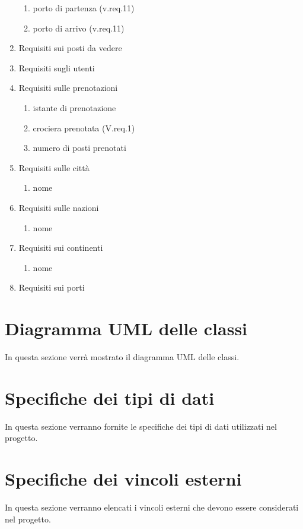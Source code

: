 \documentclass{article}
\begin{document}
\begin{enumerate}
\begin{enumerate}
        \item porto di partenza (v.req.11)
        \item porto di arrivo (v.req.11)
    \end{enumerate}
    \item Requisiti sui posti da vedere
    \item Requisiti sugli utenti
    \item Requisiti sulle prenotazioni
    \begin{enumerate}
        \item istante di prenotazione
        \item crociera prenotata (V.req.1)
        \item numero di posti prenotati
    \end{enumerate}
    \item Requisiti sulle città
    \begin{enumerate}
        \item nome
    \end{enumerate}
    \item Requisiti sulle nazioni
    \begin{enumerate}
        \item nome
    \end{enumerate}
    \item Requisiti sui continenti
    \begin{enumerate}
        \item nome
    \end{enumerate}
    \item Requisiti sui porti
\end{enumerate}


\section{Diagramma UML delle classi}

In questa sezione verrà mostrato il diagramma UML delle classi.

\section{Specifiche dei tipi di dati}

In questa sezione verranno fornite le specifiche dei tipi di dati utilizzati nel progetto.

\section{Specifiche dei vincoli esterni}

In questa sezione verranno elencati i vincoli esterni che devono essere considerati nel progetto.
\end{document}
